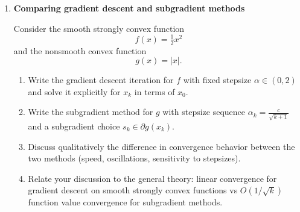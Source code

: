 \documentclass[11pt]{article}
\begin{document}
\begin{enumerate}
\begin{enumerate}
\item Explain why the cost term $\|\bm{w}-\bm{w}^{\mathrm{old}}\|_1$ models proportional transaction costs.
\item Show that the objective function is convex.
\item Write the Lagrangian including the equality constraint.
\item Derive the optimality (KKT or subgradient) conditions for a minimizer $\bm{w}^\star$.
\item Discuss qualitatively:
\begin{itemize}
\item why the $\ell_1$ term leads to \emph{sparse trades} (many zero changes),
\item how this differs from classical mean–variance optimization without transaction costs.
\end{itemize}
\end{enumerate}


\item \textbf{Comparing gradient descent and subgradient methods}

Consider the smooth strongly convex function
\[
f(x)=\tfrac{1}{2}x^2
\]
and the nonsmooth convex function
\[
g(x)=|x|.
\]

\begin{enumerate}
\item Write the gradient descent iteration for $f$ with fixed stepsize $\alpha\in(0,2)$ and solve it explicitly for $x_k$ in terms of $x_0$.
\item Write the subgradient method for $g$ with stepsize sequence $\alpha_k = \frac{c}{\sqrt{k+1}}$ and a subgradient choice $s_k \in \partial g(x_k)$.
\item Discuss qualitatively the difference in convergence behavior between the two methods (speed, oscillations, sensitivity to stepsizes).
\item Relate your discussion to the general theory: linear convergence for gradient descent on smooth strongly convex functions vs $O(1/\sqrt{k})$ function value convergence for subgradient methods.
\end{enumerate}

\end{enumerate}
\end{document}
